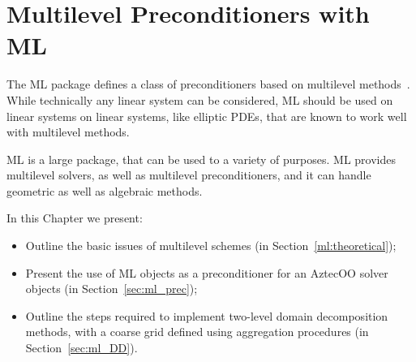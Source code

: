 % 
% 
% 
%  
%  
% 

\section{Multilevel Preconditioners with ML}
\label{chap:ml}

The ML package defines a class of preconditioners based on multilevel
methods~\cite{TuminaroTong:00a}. While technically any linear system can
be considered, ML should be used on linear systems on linear systems,
like elliptic PDEs, that are known to work well with multilevel methods.

ML is a large package, that can be used to a variety of purposes. ML
provides multilevel solvers, as well as multilevel preconditioners, and
it can handle geometric as well as algebraic methods.

In this Chapter we present:
\begin{itemize}
\item Outline the basic issues of multilevel schemes (in
  Section~\ref{ml:theoretical});
\item Present the use of ML objects as a preconditioner for an AztecOO
  solver objects (in Section~\ref{sec:ml_prec});
\item Outline the steps required to implement two-level domain
  decomposition methods, with a coarse grid defined using aggregation
  procedures (in Section~\ref{sec:ml_DD}).
\end{itemize}

